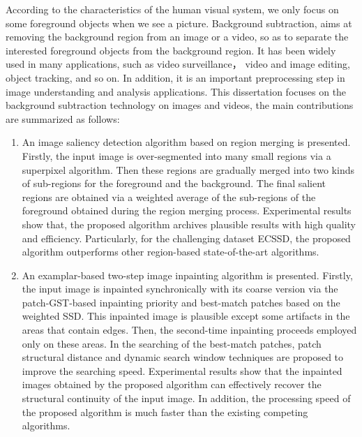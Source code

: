 \begin{eabstract}
   According to the characteristics of the human visual system, we only focus on some foreground objects when we see a picture. Background subtraction, aims at removing the background region from an image or a video, so as to separate the interested foreground objects from the background region. It has been widely used in many applications, such as video surveillance， video and image editing, object tracking, and so on. In addition, it is an important preprocessing step in image  understanding and analysis applications. This dissertation focuses on the background subtraction technology on images and videos, the main contributions are summarized as follows:
   \begin{enumerate}
   \item An image saliency detection algorithm based on region merging is presented. Firstly, the input image is over-segmented into many small regions via a superpixel algorithm. Then these regions are gradually merged into two kinds of sub-regions for the foreground and the background. The final salient regions are obtained via a weighted average of the sub-regions of the  foreground obtained during the region merging process. Experimental results show that, the proposed algorithm archives plausible results with high quality and efficiency. Particularly, for the challenging dataset ECSSD, the proposed algorithm outperforms other region-based state-of-the-art algorithms.
   \item An examplar-based two-step image inpainting algorithm is presented. Firstly, the input image is inpainted synchronically with its coarse version via the patch-GST-based inpainting priority and best-match patches based on the weighted SSD. This inpainted image is plausible except some artifacts in the areas that contain edges. Then, the second-time inpainting proceeds employed only on these areas. In the searching of the best-match patches, patch structural distance and dynamic search window techniques are proposed to improve the searching speed. Experimental results show that the inpainted images obtained by the proposed algorithm can effectively recover the structural continuity of the input image. In addition, the processing speed of the proposed algorithm is much faster than the existing competing algorithms.

\end{enumerate}
\end{eabstract}
